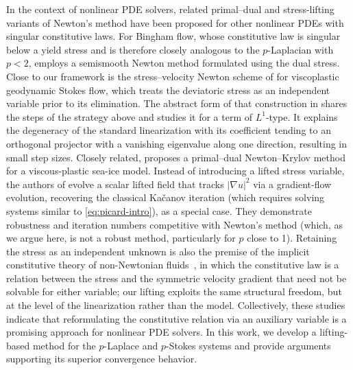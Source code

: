 \documentclass[11pt,pdflatex,sn-mathphys-num]{sn-jnl}
\theoremstyle{thmstyleone}%
\theoremstyle{thmstyletwo}%
\theoremstyle{thmstylethree}%
\begin{document}
In the context of nonlinear PDE solvers, related primal--dual and stress-lifting variants of Newton's method have been proposed for other nonlinear PDEs with singular constitutive laws.
For Bingham flow, whose constitutive law is singular below a yield stress and is therefore closely analogous to the $p$-Laplacian with $p<2$, \cite{DelosreyesGonzalez09} employs
a semismooth Newton method formulated using the dual stress. Close to our framework is the stress--velocity Newton scheme of \cite{RudiShihStadler20,Rudi18} for viscoplastic geodynamic Stokes flow, which treats the deviatoric stress as an independent variable prior to its elimination. The abstract form of that construction in \cite[Sec 5.3]{Rudi18} shares the steps of the strategy above and studies it for a term of $L^1$-type. It
explains the degeneracy of the standard linearization with its coefficient tending to an orthogonal projector with a vanishing eigenvalue along one direction, resulting in small step sizes.
Closely related, \cite{ShihMehlmannLoschEtAl22} proposes a primal--dual Newton--Krylov method for a viscous-plastic sea-ice model.
Instead of introducing a lifted stress variable, the authors of \cite{ZampiniBoffiDovletovMarkowich26} evolve a scalar lifted field that tracks $|\nabla u|^2$ via a gradient-flow evolution, recovering the classical Ka\v{c}anov iteration (which requires solving systems similar to \eqref{eq:picard-intro}), as a special case. They demonstrate robustness and iteration numbers competitive with Newton's method (which, as we argue here, is not a robust method, particularly for $p$ close to 1).
Retaining the stress as an independent unknown is also the premise of the implicit constitutive theory of non-Newtonian fluids~\cite{BulicekGwiazdaMalekEtAl12}, in which the constitutive law is a relation between the stress and the symmetric velocity gradient that need not be solvable for either variable; our lifting exploits the same structural freedom, but at the level of the linearization rather than the model.
Collectively, these studies indicate that reformulating the constitutive relation via an auxiliary variable is a promising approach for nonlinear PDE solvers. In this work, we develop a lifting-based method for the $p$-Laplace and $p$-Stokes systems and provide arguments supporting its superior convergence behavior.
\end{document}
